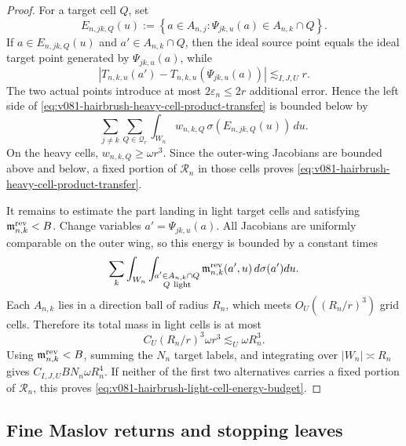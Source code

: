 \documentclass[10pt]{article}
\begin{document}
\begin{proof}
For a target cell \(Q\), set
\[
E_{n,jk,Q}(u)
:=
\left\{
a\in A_{n,j}:
\Psi_{jk,u}(a)\in A_{n,k}\cap Q
\right\}.
\]
If \(a\in E_{n,jk,Q}(u)\) and \(a'\in A_{n,k}\cap Q\), then the ideal source point equals the
ideal target point generated by \(\Psi_{jk,u}(a)\), while
\[
|T_{n,k,u}(a')-T_{n,k,u}(\Psi_{jk,u}(a))|
\lesssim_{I,J,U}r.
\]
The two actual points introduce at most \(2\varepsilon_n\le2r\) additional error.  Hence the
left side of \eqref{eq:v081-hairbrush-heavy-cell-product-transfer} is bounded below by
\begin{equation}
\label{eq:v081-hairbrush-cell-weighted-coupling}
\sum_{j\ne k}\sum_{Q\in\mathcal Q_r}
\int_{W_n}
w_{n,k,Q}\,
\sigma(E_{n,jk,Q}(u))\,du.
\end{equation}
On the heavy cells, \(w_{n,k,Q}\ge\omega r^3\).  Since the outer-wing Jacobians are bounded above
and below, a fixed portion of \(\mathcal R_n\) in those cells proves
\eqref{eq:v081-hairbrush-heavy-cell-product-transfer}.

It remains to estimate the part landing in light target cells and satisfying
\(\mathfrak m^{\rm rev}_{n,k}<B\).  Change variables
\(a'=\Psi_{jk,u}(a)\).  All Jacobians are uniformly comparable on the outer wing, so this energy is
bounded by a constant times
\[
\sum_k\int_{W_n}
\int_{\substack{a'\in A_{n,k}\cap Q\\
Q\ {\rm light}}}
\mathfrak m^{\rm rev}_{n,k}(a',u)\,d\sigma(a')du.
\]
Each \(A_{n,k}\) lies in a direction ball of radius \(R_n\), which meets
\(O_U((R_n/r)^3)\) grid cells.  Therefore its total mass in light cells is at most
\[
C_U(R_n/r)^3\omega r^3
\lesssim_U\omega R_n^3.
\]
Using \(\mathfrak m^{\rm rev}_{n,k}<B\), summing the \(N_n\) target labels, and integrating over
\(|W_n|\asymp R_n\) gives \(C_{I,J,U}BN_n\omega R_n^4\).  If neither of the first two alternatives
carries a fixed portion of \(\mathcal R_n\), this proves
\eqref{eq:v081-hairbrush-light-cell-energy-budget}.
\end{proof}

\subsection{Fine Maslov returns and stopping leaves}
\end{document}
